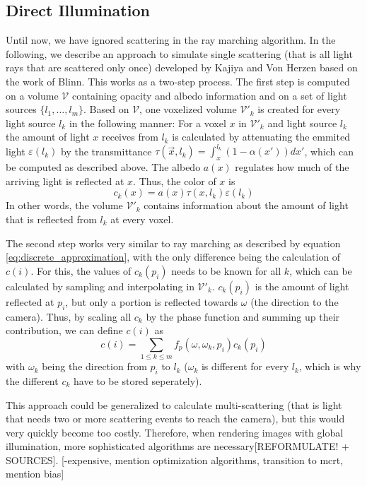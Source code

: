 \subsection{Direct Illumination}\label{subsec:direct_illumination}
Until now, we have ignored scattering in the ray marching algorithm. In the following, we describe an approach to simulate single scattering (that is all light rays that are scattered only once) developed by Kajiya and Von Herzen\cite{10.1145/964965.808594} based on the work of Blinn\cite{10.1145/965145.801255}.
This works as a two-step process.
The first step is computed on a volume $\mathcal{V}$ containing opacity and albedo information and on a set of light sources $\{l_1, \ldots, l_m\}$.
Based on $\mathcal{V}$, one voxelized volume $\mathcal{V}'_k$ is created for every light source $l_k$ in the following manner:
For a voxel ${x}$ in $\mathcal{V}'_k$ and light source $l_k$ the amount of light ${x}$ receives from $l_k$ is calculated by attenuating the emmited light $\varepsilon(l_k)$ by the transmittance $\tau(\vec{x}, l_k) = \int_{{x}}^{l_k}(1 - \alpha({x'}))d{x'}$, which can be computed as described above.
 The albedo $a({x})$ regulates how much of the arriving light is reflected at ${x}$. Thus, the color of ${x}$ is
\begin{equation}
c_k({x}) = a({x}) \tau({x}, l_k) \varepsilon(l_k)
\end{equation}
In other words, the volume $\mathcal{V}'_k$ contains information about the amount of light that is reflected from $l_k$ at every voxel.

The second step works very similar to ray marching as described by equation \ref{eq:discrete_approximation}, with the only difference being the calculation of $c(i)$. For this, the values of $c_k(p_i)$ needs to be known for all $k$, which can be calculated by sampling and interpolating in $\mathcal{V'}_k$.
$c_k(p_i)$ is the amount of light reflected at $p_i$, but only a portion is reflected towards $\omega$ (the direction to the camera). Thus, by scaling all $c_k$ by the phase function and summing up their contribution, we can define $c(i)$ as
\begin{equation}
c(i) = \sum_{1 \le k \le m} f_p(\omega, \omega_k, p_i)c_k(p_i)
\end{equation}
with $\omega_k$ being the direction from $p_i$ to $l_k$ ($\omega_k$ is different for every $l_k$, which is why the different $c_k$ have to be stored seperately).

This approach could be generalized to calculate multi-scattering (that is light that needs two or more scattering events to reach the camera), but this would very quickly become too costly. Therefore, when rendering images with global illumination, more sophisticated algorithms are necessary[REFORMULATE! + SOURCES].
[-expensive, mention optimization algorithms, transition to mcrt, mention bias]









